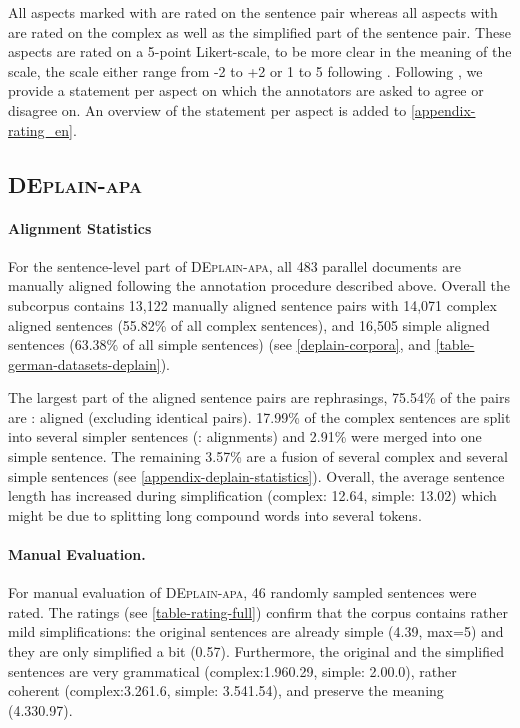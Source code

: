 \documentclass[11pt]{article}
\begin{document}
All aspects marked with  are rated on the sentence pair whereas all aspects with  are rated on the complex as well as the simplified part of the sentence pair. These aspects are rated on a 5-point Likert-scale, to be more clear in the meaning of the scale, the scale either range from -2 to +2 or 1 to 5 following \citet{stodden-2021-scale-unclear}.
Following \citet{alva-manchego-etal-2020-asset,maddela-etal-2021-controllable}, we provide a statement per aspect on which the annotators are asked to agree or disagree on. An overview of the statement per aspect is added to \autoref{appendix-rating_en}. 




\subsection{\textsc{DEplain-apa}}
\label{sec-deplain-apa-sent}
\paragraph{Alignment Statistics}
For the sentence-level part of \textsc{DEplain-apa}, all 483 parallel documents are manually aligned following the annotation procedure described above. Overall the subcorpus contains 13,122 manually aligned sentence pairs with 14,071 complex aligned sentences (55.82\% of all complex sentences), and 16,505 simple aligned sentences (63.38\% of all simple sentences) (see \autoref{deplain-corpora}, and \autoref{table-german-datasets-deplain}). 


The largest part of the aligned sentence pairs are rephrasings, 75.54\% of the pairs are : aligned (excluding identical pairs). 17.99\% of the complex sentences are split into several simpler sentences (: alignments) and 2.91\% were merged into one simple sentence. The remaining 3.57\% are a fusion of several complex and several simple sentences (see \autoref{appendix-deplain-statistics}). Overall, the average sentence length has increased during simplification (complex: 12.64, simple: 13.02) which might be due to splitting long compound words into several tokens.


\paragraph{Manual Evaluation.}
For manual evaluation of \textsc{DEplain-apa}, 46 randomly sampled sentences were rated. The ratings (see \autoref{table-rating-full}) confirm that the corpus contains rather mild simplifications: the original sentences are already simple (4.39, max=5) and they are only simplified a bit (0.57). Furthermore, the original and the simplified sentences are very grammatical (complex:1.960.29, simple: 2.00.0), rather coherent (complex:3.261.6, simple: 3.541.54), and preserve the meaning (4.330.97). 
\end{document}
